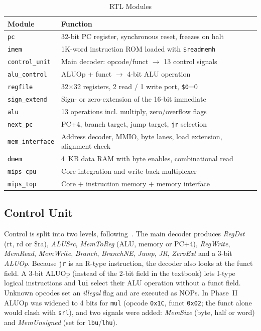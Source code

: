 \documentclass[conference]{IEEEtran}
\begin{document}
\begin{table}[htbp]
\caption{RTL Modules}
\label{tab:modules}
\centering
\footnotesize
\begin{tabular}{@{}p{2.25cm}p{5.6cm}@{}}
\toprule
Module & Function \\
\midrule
\texttt{pc} & 32-bit PC register, synchronous reset, freezes on halt \\
\texttt{imem} & 1K-word instruction ROM loaded with \texttt{\$readmemh} \\
\texttt{control\_unit} & Main decoder: opcode/funct $\rightarrow$ 13 control signals \\
\texttt{alu\_control} & ALUOp + funct $\rightarrow$ 4-bit ALU operation \\
\texttt{regfile} & 32$\times$32 registers, 2 read / 1 write port, \texttt{\$0}=0 \\
\texttt{sign\_extend} & Sign- or zero-extension of the 16-bit immediate \\
\texttt{alu} & 13 operations incl. multiply, zero/overflow flags \\
\texttt{next\_pc} & PC+4, branch target, jump target, \texttt{jr} selection \\
\texttt{mem\_interface} & Address decoder, MMIO, byte lanes, load extension, alignment check \\
\texttt{dmem} & 4~KB data RAM with byte enables, combinational read \\
\texttt{mips\_cpu} & Core integration and write-back multiplexer \\
\texttt{mips\_top} & Core + instruction memory + memory interface \\
\bottomrule
\end{tabular}
\end{table}

\subsection{Control Unit}
Control is split into two levels, following~\cite{patterson}. The main decoder produces \textit{RegDst} (rt, rd or \$ra), \textit{ALUSrc}, \textit{MemToReg} (ALU, memory or PC+4), \textit{RegWrite}, \textit{MemRead}, \textit{MemWrite}, \textit{Branch}, \textit{BranchNE}, \textit{Jump}, \textit{JR}, \textit{ZeroExt} and a 3-bit \textit{ALUOp}. Because \texttt{jr} is an R-type instruction, the decoder also looks at the funct field. A 3-bit ALUOp (instead of the 2-bit field in the textbook) lets I-type logical instructions and \texttt{lui} select their ALU operation without a funct field. Unknown opcodes set an \textit{illegal} flag and are executed as NOPs. In Phase~II ALUOp was widened to 4 bits for \texttt{mul} (opcode \texttt{0x1C}, funct \texttt{0x02}; the funct alone would clash with \texttt{srl}), and two signals were added: \textit{MemSize} (byte, half or word) and \textit{MemUnsigned} (set for \texttt{lbu}/\texttt{lhu}).
\end{document}
